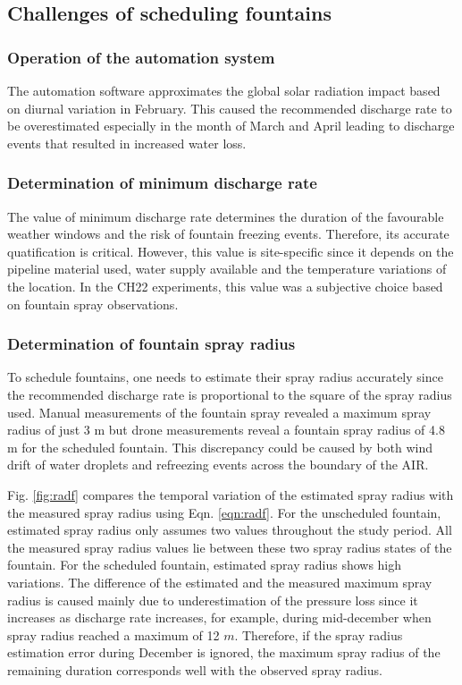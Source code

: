 \documentclass[tc, manuscript]{copernicus}
\begin{document}
\subsection{Challenges of scheduling fountains}

\subsubsection{Operation of the automation system}

The automation software approximates the global solar radiation impact based on diurnal variation in February.
This caused the recommended discharge rate to be overestimated especially in the month of March and April
leading to discharge events that resulted in increased water loss.

\subsubsection{Determination of minimum discharge rate}

The value of minimum discharge rate determines the duration of the favourable weather windows and the risk of
fountain freezing events. Therefore, its accurate quatification is critical. However, this value is
site-specific since it depends on the pipeline material used, water supply available and the temperature
variations of the location. In the CH22 experiments, this value was a subjective choice based on fountain spray
observations.

\subsubsection{Determination of fountain spray radius}

To schedule fountains, one needs to estimate their spray radius accurately since the recommended discharge rate
is proportional to the square of the spray radius used.  Manual measurements of the fountain spray revealed a
maximum spray radius of just 3 m but drone measurements reveal a fountain spray radius of 4.8 m for the
scheduled fountain. This discrepancy could be caused by both wind drift of water droplets and refreezing events
across the boundary of the AIR. 


Fig. \ref{fig:radf} compares the temporal variation of the estimated spray radius with the measured spray radius
using Eqn. \ref{eqn:radf}. For the unscheduled fountain, estimated spray radius only assumes two values
throughout the study period. All the measured spray radius values lie between these two spray radius states of
the fountain. For the scheduled fountain, estimated spray radius shows high variations. The difference of the
estimated and the measured maximum spray radius is caused mainly due to underestimation of the pressure loss
since it increases as discharge rate increases, for example, during mid-december when spray radius reached a
maximum of 12 $m$. Therefore, if the spray radius estimation error during December is ignored, the maximum spray
radius of the remaining duration corresponds well with the observed spray radius.
\end{document}
